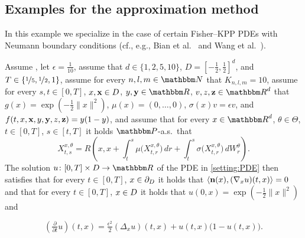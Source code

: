 	\subsection{Examples for the approximation method}

	\begin{example}
		\label{exampleMLP:fisherkpp_neumann}
		In this example we specialize  in the case of certain Fisher--KPP PDEs with Neumann boundary conditions (cf., e.g., Bian et al.~\cite{Bian2017} and Wang et al.~\cite{Wang2021}).
		
		Assume ,
		let 
		$\epsilon = \tfrac{1}{10}$,
		assume that
		$d\in\{1,2,5,10\}$,
		$D = [-\tfrac{1}{2},\tfrac{1}{2}]^d$, and
		$T\in\{\nicefrac{1}{5},\nicefrac{1}{2},1\}$,
		assume for every 
		$n,l,m\in \N$ 
		that
		$K_{n,l,m} = 10$,
		assume for every $s,t \in [0,T]$,
		$x,{\textbf x} \in D$,
		$y,{\textbf y} \in \R$,
		$v,z, {\textbf z} \in \R^d$ 
		that
		$g(x)= \exp (- \tfrac{1}{2}\|x\|^2)$,
		$\mu(x)=(0,\dots,0)$, 
		$\sigma(x) v = \epsilon v$, and
		$f(t,x,{\textbf x},y,{\textbf y}, z, {\textbf z})= y(1-y)$,
		and
		assume that for every 
		$x\in \R^{d}$, 
		$\theta \in \Theta$, 
		$t\in [0,T]$, 
		$s\in [t,T]$ 
		it holds 
		$\P$-a.s.\ that
		\begin{equation}
		X^{x,\theta}_{t,s} 
		= R\!\left(x,x + \int_{t}^{s} \mu\big(X^{x,\theta}_{t,r}\big) \, dr + \int^{s}_{t} \sigma \big(X^{x,\theta}_{t,r}\big) \, dW^{\theta}_{r} \right).
		\end{equation}
		The solution $u\colon[0,T]\times \D \to \R$ of the PDE in \eqref{setting:PDE} then satisfies that for every
		$t\in [0,T]$, $x\in\partial_D$
		it holds that
		$\left<{\textbf n}(x) ,(\nabla_x u)(t,x)\right> = 0$
		and that for every
		$t\in [0,T]$, $x\in D$
		it holds that
		$u(0,x) = \exp (- \tfrac{1}{2}\|x\|^2)$ and
		
		\begin{equation}
			(\tfrac{\partial }{\partial t}u) (t,x) =
									\tfrac{\epsilon^2}{2}(\Delta_x u) (t,x) +
									u(t,x)\big(1 - u(t,x) \big).
			\label{eqMLP:fisherKPP_neumann}
		\end{equation}
		
\end{example}


